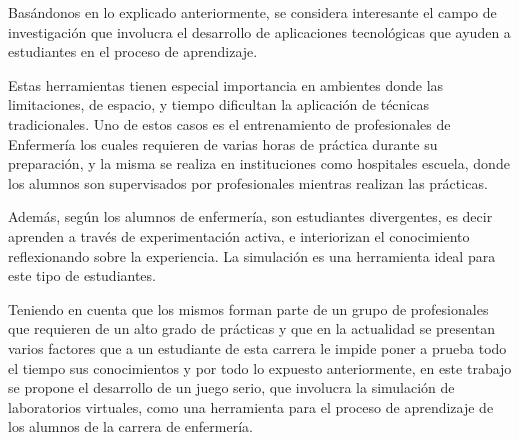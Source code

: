Basándonos en lo explicado anteriormente, se considera interesante el campo de
investigación que involucra el desarrollo de aplicaciones tecnológicas que
ayuden a estudiantes en el proceso de aprendizaje. 

Estas herramientas tienen especial importancia en ambientes donde las
limitaciones, de espacio, y tiempo dificultan la aplicación de técnicas
tradicionales. Uno de estos casos es el entrenamiento de profesionales de
Enfermería los cuales requieren de varias horas de práctica durante su
preparación, y la misma se realiza en instituciones como hospitales escuela,
donde los alumnos son supervisados por profesionales mientras realizan las
prácticas.

Además, según \cite{humphreys2013developing} los alumnos de enfermería, son
estudiantes divergentes, es decir aprenden a través de experimentación activa, e
interiorizan el conocimiento reflexionando sobre la experiencia. La simulación
es una herramienta ideal para este tipo de
estudiantes\cite{humphreys2013developing}.

Teniendo en cuenta que los mismos forman parte de un grupo de profesionales que
requieren de un alto grado de prácticas y que en la actualidad se presentan
varios factores que a un estudiante de esta carrera le impide poner a prueba
todo el tiempo sus conocimientos y por todo lo expuesto anteriormente, en este
trabajo se propone el desarrollo de un juego serio, que involucra la simulación
de laboratorios virtuales, como una herramienta para el proceso de aprendizaje
de los alumnos de la carrera de enfermería.



